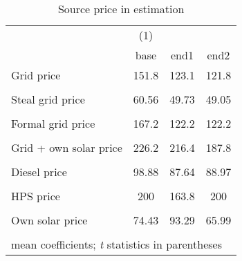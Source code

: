 \begin{table}[htbp]\centering
\caption{Source price in estimation}
\begin{tabular}{l*{3}{c}}
\toprule
                &\multicolumn{1}{c}{(1)}&         &         \\
                &     base&     end1&     end2\\
\midrule
Grid price      &    151.8&    123.1&    121.8\\
                &         &         &         \\
\addlinespace
Steal grid price&    60.56&    49.73&    49.05\\
                &         &         &         \\
\addlinespace
Formal grid price&    167.2&    122.2&    122.2\\
                &         &         &         \\
\addlinespace
Grid + own solar price&    226.2&    216.4&    187.8\\
                &         &         &         \\
\addlinespace
Diesel price    &    98.88&    87.64&    88.97\\
                &         &         &         \\
\addlinespace
HPS price       &      200&    163.8&      200\\
                &         &         &         \\
\addlinespace
Own solar price &    74.43&    93.29&    65.99\\
                &         &         &         \\
\bottomrule
\multicolumn{4}{l}{\footnotesize mean coefficients; \textit{t} statistics in parentheses}\\
\end{tabular}
\end{table}
